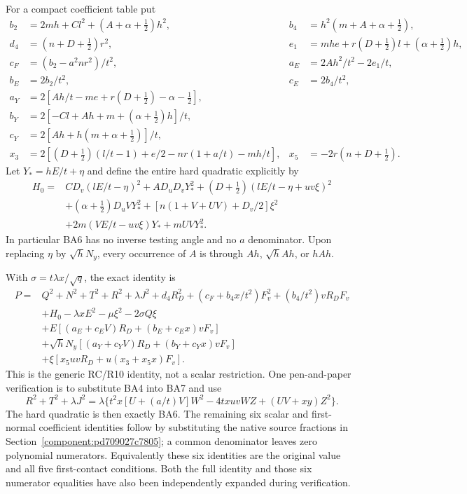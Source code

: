 For a compact coefficient table put
\[
 \begin{aligned}
 b_2&=2mh+Cl^2+(A+\alpha+\tfrac12)h^2,&
 b_4&=h^2(m+A+\alpha+\tfrac12),\\
 d_4&=(n+D+\tfrac12)r^2,&
 e_1&=mhe+r(D+\tfrac12)l+(\alpha+\tfrac12)h,\\
 c_F&=(b_2-a^2nr^2)/t^2,&
 a_E&=2Ah^2/t^2-2e_1/t,\\
 b_E&=2b_2/t^2,&c_E&=2b_4/t^2,\\
 a_Y&=2[Ah/t-me+r(D+\tfrac12)-\alpha-\tfrac12],\\
 b_Y&=2[-Cl+Ah+m+(\alpha+\tfrac12)h]/t,\\
 c_Y&=2[Ah+h(m+\alpha+\tfrac12)]/t,\\
 x_3&=2[(D+\tfrac12)(l/t-1)+e/2-nr(1+a/t)-mh/t],&
 x_5&=-2r(n+D+\tfrac12).
 \end{aligned}                                                     \tag{BA5}
\]
Let $Y_*=hE/t+\eta$ and define the entire hard quadratic explicitly by
\[
 \begin{split}
 H_0={}&CD_v(lE/t-\eta)^2+AD_uD_vY_*^2
 +(D+\tfrac12)(lE/t-\eta+uv\xi)^2\\
 &+(\alpha+\tfrac12)D_uVY_*^2
 +[n(1+V+UV)+D_v/2]\xi^2\\
 &+2m(VE/t-uv\xi)Y_*+mUVY_*^2.
 \end{split}                                                       \tag{BA6}
\]
In particular BA6 has no inverse testing angle and no $a$ denominator.
Upon replacing $\eta$ by $\sqrt hN_y$, every occurrence of $A$
is through $Ah$, $\sqrt hAh$, or $hAh$.

With $\sigma=t\lambda x/\sqrt q$, the exact identity is
\[
 \begin{split}
 P={}&Q^2+N^2+T^2+R^2+\lambda J^2+d_4R_D^2
 +(c_F+b_4x/t^2)F_v^2+(b_4/t^2)vR_DF_v\\
 &+H_0-\lambda xE^2-\mu\xi^2-2\sigma Q\xi\\
 &+E[(a_E+c_EV)R_D+(b_E+c_Ex)vF_v]\\
 &+\sqrt hN_y[(a_Y+c_YV)R_D+(b_Y+c_Yx)vF_v]\\
 &+\xi[x_5uvR_D+u(x_3+x_5x)F_v].
 \end{split}\tag{BA7}
\]
This is the generic RC/R10 identity, not a scalar restriction.
One pen-and-paper verification is to substitute BA4 into BA7 and use
\[
 R^2+T^2+\lambda J^2
 =\lambda\{t^2x[U+(a/t)V]W^2-4txuvWZ+(UV+xy)Z^2\}.
\]
The hard quadratic is then exactly BA6. The remaining six scalar
and first-normal coefficient identities follow by substituting the native source fractions in Section~\ref{component:pd709027c7805};
a common denominator leaves zero polynomial numerators. Equivalently
these six identities are the original value and all five first-contact
conditions. Both the full identity and those six numerator equalities
have also been independently expanded during verification.

